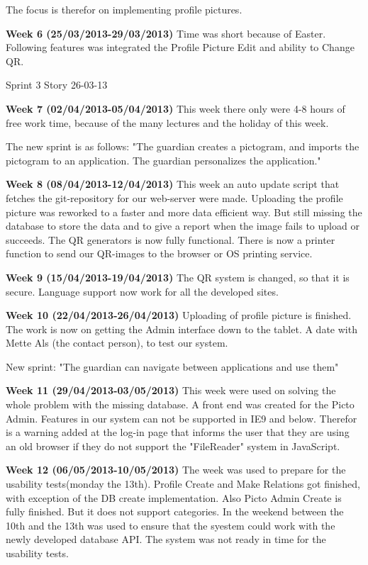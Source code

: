 The focus is therefor on implementing profile pictures. 

\textbf{Week 6 (25/03/2013-29/03/2013)}
Time was short because of Easter. 
Following features was integrated the Profile Picture Edit and ability to Change QR.

Sprint 3 Story 26-03-13


\textbf{Week 7 (02/04/2013-05/04/2013)}
This week there only were 4-8 hours of free work time, because of the many lectures and the holiday of this week.

The new sprint is as follows: 
"The guardian creates a pictogram, and imports the pictogram to an application. The guardian personalizes the application."



\textbf{Week 8 (08/04/2013-12/04/2013)}
This week an auto update script that fetches the git-repository for our web-server were made.
Uploading the profile picture was reworked to a faster and more data efficient way. 
But still missing the database to store the data and to give a report when the image fails to upload or succeeds.
The QR generators is now fully functional. 
There is now a printer function to send our QR-images to the browser or OS printing service.

\textbf{Week 9 (15/04/2013-19/04/2013)}
The QR system is changed, so that it is secure. 
Language support now work for all the developed sites.


\textbf{Week 10 (22/04/2013-26/04/2013)}
Uploading of profile picture is finished.
The work is now on getting the Admin interface down to the tablet.
A date with Mette Als (the contact person), to test our system.

New sprint: 
"The guardian can navigate between applications and use them"

\textbf{Week 11 (29/04/2013-03/05/2013)}
This week were used on solving the whole problem with the missing database.
A front end was created for the Picto Admin. Features  in our system can not be supported in IE9 and below. Therefor is a warning added at the log-in page that informs the user that they are using an old browser if they do not support the "FileReader" system in JavaScript.

\textbf{Week 12 (06/05/2013-10/05/2013)}
The week was used to prepare for the usability tests(monday the 13th).
Profile Create and Make Relations got finished, with exception of the DB create implementation. 
Also Picto Admin Create is fully finished. But it does not support categories. 
In the weekend between the 10th and the 13th was used to ensure that the syestem could work with the newly developed database API. The system was not ready in time for the usability tests. 

